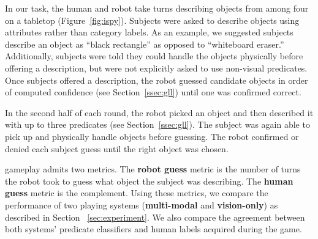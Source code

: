 In our \ispy task, the human and robot take turns describing objects from among four on a tabletop (Figure~\ref{fig:ispy}).
Subjects were asked to describe objects using attributes rather than category labels.
As an example, we suggested subjects describe an object as ``black rectangle'' as opposed to ``whiteboard eraser.''
Additionally, subjects were told they could handle the objects physically before offering a description, but were not explicitly asked to use non-visual predicates.
Once subjects offered a description, the robot guessed candidate objects in order of computed confidence (see Section~\ref{ssec:gll}) until one was confirmed correct.

In the second half of each round, the robot picked an object and then described it with up to three predicates (see Section~\ref{ssec:gll}).
The subject was again able to pick up and physically handle objects before guessing.
The robot confirmed or denied each subject guess until the right object was chosen.

\ispy gameplay admits two metrics.
The \textbf{robot guess} metric is the number of turns the robot took to guess what object the subject was describing.
The \textbf{human guess} metric is the complement.
Using these metrics, we compare the performance of two \ispy playing systems (\textbf{multi-modal} and \textbf{vision-only}) as described in Section ~\ref{sec:experiment}.
We also compare the agreement between both systems' predicate classifiers and human labels acquired during the game.